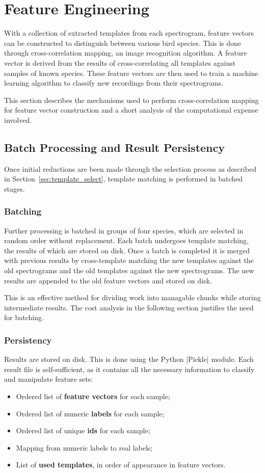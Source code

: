 \section{Feature Engineering}\label{sec:ccm}
With a collection of extracted templates from each spectrogram, feature vectors
can be constructed to distinguish between various bird species.
This is done through cross-correlation mapping, an image recognition algorithm.
A feature vector is derived from the results of cross-correlating all
templates against samples of known species.
These feature vectors are then used to train a machine learning algorithm to
classify new recordings from their spectrograms.

This section describes the mechanisms used to perform cross-correlation mapping
for feature vector construction and a short analysis of the computational
expense involved.

\subsection{Batch Processing and Result Persistency}
Once initial reductions are been made through the selection process as described
in Section~\ref{sec:template_select}, template matching is performed in batched
stages.

\subsubsection{Batching}
Further processing is batched in groups of four species, which are selected in
random order without replacement.
Each batch undergoes template matching, the results of which are stored on disk.
Once a batch is completed it is merged with previous results by cross-template
matching the new templates against the old spectrograms and the old templates
against the new spectrograms.
The new results are appended to the old feature vectors and stored on disk.

This is an effective method for dividing work into managable chunks while storing
intermediate results.
The cost analysis in the following section justifies the need for batching.

\subsubsection{Persistency}
Results are stored on disk.
This is done using the Python |Pickle| module.
Each result file is self-sufficient, as it contains all the necessary information
to classify and manipulate feature sets:
\begin{itemize}[noitemsep]
  \item Ordered list of \textbf{feature vectors} for each sample;
  \item Ordered list of numeric \textbf{labels} for each sample;
  \item Ordered list of unique \textbf{ids} for each sample;
  \item Mapping from numeric labels to real labels;
  \item List of \textbf{used templates}, in order of appearance in feature vectors.
\end{itemize}

